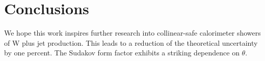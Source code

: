 \section{Conclusions}\label{sec:conclusions}

We hope this work inspires further research into collinear-safe
calorimeter showers of W plus jet production. This leads to a reduction
of the theoretical uncertainty by one percent. The Sudakov form factor
exhibits a striking dependence on $\theta$.

